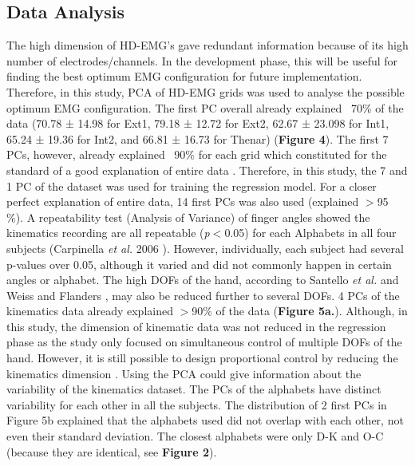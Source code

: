\documentclass[conference]{IEEEtran}
\begin{document}
\subsection{Data Analysis}
The high dimension of HD-EMG’s gave redundant information because of its high number of 
electrodes/channels. In the development phase, this will be useful for finding the best optimum EMG
configuration for future implementation. Therefore, in this study, PCA of HD-EMG grids was used to 
analyse the possible optimum EMG configuration. The first PC overall already explained ~70\% of the data 
(70.78 ± 14.98 for Ext1, 79.18 ± 12.72 for Ext2, 62.67 ± 23.098 for Int1, 65.24 ± 19.36 for Int2, and 66.81 
± 16.73 for Thenar) (\textbf{Figure 4}). The first 7 PCs, however, already explained ~90\% for each grid which 
constituted for the standard of a good explanation of entire data \cite{b9}\cite{b23}. Therefore, in this study, the 7 and 1 
PC of the dataset was used for training the regression model. For a closer perfect explanation of entire data, 
14 first PCs was also used (explained $>$95 \%).
A repeatability test (Analysis of Variance) of finger angles showed the kinematics recording are all 
repeatable (\textit{p}$<$0.05) for each Alphabets in all four subjects (Carpinella \textit{et al.} 2006 \cite{b25}). However, 
individually, each subject had several p-values over 0.05, although it varied and did not commonly happen 
in certain angles or alphabet.
The high DOFs of the hand, according to Santello \textit{et al.} \cite{b32} and Weiss and Flanders \cite{b28}, may also be 
reduced further to several DOFs. 4 PCs of the kinematics data already explained $>$90\% of the data (\textbf{Figure 5a.}). Although, in this study, the dimension of kinematic data was not reduced in the regression phase as the 
study only focused on simultaneous control of multiple DOFs of the hand. However, it is still possible to
design proportional control by reducing the kinematics dimension \cite{b36}.
Using the PCA could give information about the variability of the kinematics dataset. The PCs of the
alphabets have distinct variability for each other in all the subjects. The distribution of 2 first PCs in Figure 
5b explained that the alphabets used did not overlap with each other, not even their standard deviation. The 
closest alphabets were only D-K and O-C (because they are identical, see \textbf{Figure 2}).
\end{document}
